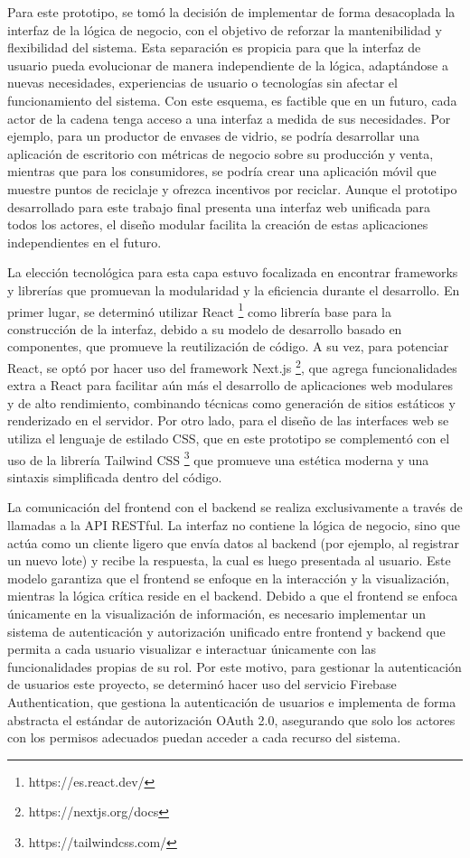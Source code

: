 Para este prototipo, se tomó la decisión de implementar de forma desacoplada la interfaz de la lógica de negocio, con el objetivo de reforzar la mantenibilidad y flexibilidad del sistema. Esta separación es propicia para que la interfaz de usuario pueda evolucionar de manera independiente de la lógica, adaptándose a nuevas necesidades, experiencias de usuario o tecnologías sin afectar el funcionamiento del sistema. Con este esquema, es factible que en un futuro, cada actor de la cadena tenga acceso a una interfaz a medida de sus necesidades. Por ejemplo, para un productor de envases de vidrio, se podría desarrollar una aplicación de escritorio con métricas de negocio sobre su producción y venta, mientras que para los consumidores, se podría crear una aplicación móvil que muestre puntos de reciclaje y ofrezca incentivos por reciclar. Aunque el prototipo desarrollado para este trabajo final presenta una interfaz web unificada para todos los actores, el diseño modular facilita la creación de estas aplicaciones independientes en el futuro.

La elección tecnológica para esta capa estuvo focalizada en encontrar frameworks y librerías que promuevan la modularidad y la eficiencia durante el desarrollo. En primer lugar, se determinó utilizar React \footnote{https://es.react.dev/} como librería base para la construcción de la interfaz, debido a su modelo de desarrollo basado en componentes, que promueve la reutilización de código. A su vez, para potenciar React, se optó por hacer uso del framework Next.js \footnote{https://nextjs.org/docs}, que agrega funcionalidades extra a React para facilitar aún más el desarrollo de aplicaciones web modulares y de alto rendimiento, combinando técnicas como generación de sitios estáticos y renderizado en el servidor. Por otro lado, para el diseño de las interfaces web se utiliza el lenguaje de estilado CSS, que en este prototipo se complementó con el uso de la librería Tailwind CSS \footnote{https://tailwindcss.com/} que promueve una estética moderna y una sintaxis simplificada dentro del código.

La comunicación del frontend con el backend se realiza exclusivamente a través de llamadas a la API RESTful. La interfaz no contiene la lógica de negocio, sino que actúa como un cliente ligero que envía datos al backend (por ejemplo, al registrar un nuevo lote) y recibe la respuesta, la cual es luego presentada al usuario. Este modelo garantiza que el frontend se enfoque en la interacción y la visualización, mientras la lógica crítica reside en el backend. Debido a que el frontend se enfoca únicamente en la visualización de información, es necesario implementar un sistema de autenticación y autorización unificado entre frontend y backend que permita a cada usuario visualizar e interactuar únicamente con las funcionalidades propias de su rol. Por este motivo, para gestionar la autenticación de usuarios este proyecto, se determinó hacer uso del servicio Firebase Authentication, que gestiona la autenticación de usuarios e implementa de forma abstracta el estándar de autorización OAuth 2.0, asegurando que solo los actores con los permisos adecuados puedan acceder a cada recurso del sistema.

